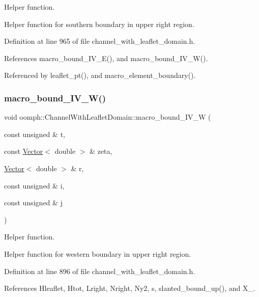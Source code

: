 Helper function. 

Helper function for southern boundary in upper right region. 

Definition at line 965 of file channel\+\_\+with\+\_\+leaflet\+\_\+domain.\+h.



References macro\+\_\+bound\+\_\+\+I\+V\+\_\+\+E(), and macro\+\_\+bound\+\_\+\+I\+V\+\_\+\+W().



Referenced by leaflet\+\_\+pt(), and macro\+\_\+element\+\_\+boundary().

\mbox{\label{classoomph_1_1ChannelWithLeafletDomain_ab9da487d185f947a30e03b43d0fc0c9b}} 
\subsubsection{\texorpdfstring{macro\+\_\+bound\+\_\+\+I\+V\+\_\+\+W()}{macro\_bound\_IV\_W()}}
{\footnotesize\ttfamily void oomph\+::\+Channel\+With\+Leaflet\+Domain\+::macro\+\_\+bound\+\_\+\+I\+V\+\_\+W (\begin{DoxyParamCaption}\item[{const unsigned \&}]{t,  }\item[{const \hyperlink{classoomph_1_1Vector}{Vector}$<$ double $>$ \&}]{zeta,  }\item[{\hyperlink{classoomph_1_1Vector}{Vector}$<$ double $>$ \&}]{r,  }\item[{const unsigned \&}]{i,  }\item[{const unsigned \&}]{j }\end{DoxyParamCaption})\hspace{0.3cm}{\ttfamily [protected]}}



Helper function. 

Helper function for western boundary in upper right region. 

Definition at line 896 of file channel\+\_\+with\+\_\+leaflet\+\_\+domain.\+h.



References Hleaflet, Htot, Lright, Nright, Ny2, s, slanted\+\_\+bound\+\_\+up(), and X\+\_.



